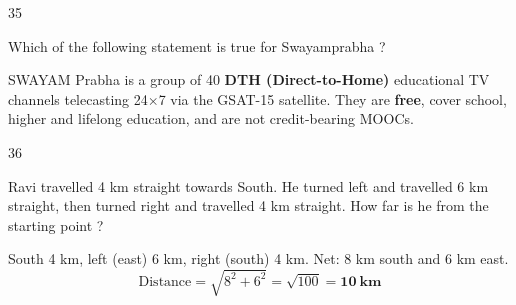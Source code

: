 \begin{question}{35}
{Which of the following statement is true for Swayamprabha ?\par}
\begin{explain}
SWAYAM Prabha is a group of 40 \textbf{DTH (Direct-to-Home)} educational TV channels telecasting 24$\times$7 via the GSAT-15 satellite. They are \textbf{free}, cover school, higher and lifelong education, and are not credit-bearing MOOCs.
\end{explain}
\end{question}

\begin{question}{36}
{Ravi travelled 4 km straight towards South. He turned left and travelled 6 km straight, then turned right and travelled 4 km straight. How far is he from the starting point ?\par}
\begin{explain}
\begin{center}
\end{center}
South 4 km, left (east) 6 km, right (south) 4 km. Net: 8 km south and 6 km east.
\[\text{Distance}=\sqrt{8^2+6^2}=\sqrt{100}=\mathbf{10\ km}\]
\end{explain}
\end{question}

